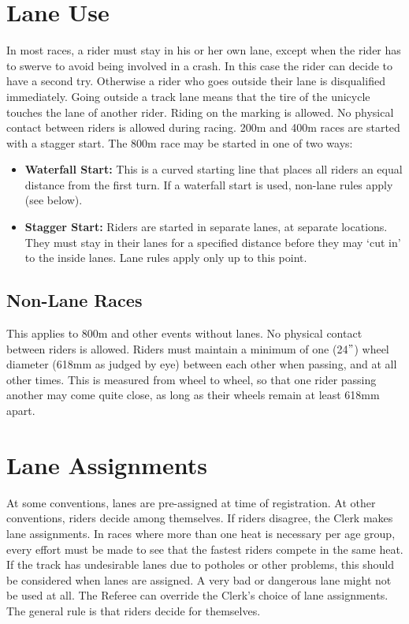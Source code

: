\section{Lane Use}
In most races, a rider must stay in his or her own lane, except when the rider has to swerve to avoid being involved in a crash.
In this case the rider can decide to have a second try.
Otherwise a rider who goes outside their lane is disqualified immediately.
Going outside a track lane means that the tire of the unicycle touches the lane of another rider.
Riding on the marking is allowed.
No physical contact between riders is allowed during racing.
200m and 400m races are started with a stagger start.
The 800m race may be started in one of two ways:
\begin{itemize}
\item \textbf{Waterfall Start:} This is a curved starting line that places all riders an equal distance from the first turn.
If a waterfall start is used, non-lane rules apply (see below).
\item \textbf{Stagger Start:} Riders are started in separate lanes, at separate locations.
They must stay in their lanes for a specified distance before they may ‘cut in' to the inside lanes.
Lane rules apply only up to this point.
\end{itemize}

\subsection{Non-Lane Races \label{subsec:track-field_lane-use_non-lane-races}}
This applies to 800m and other events without lanes.
No physical contact between riders is allowed.
Riders must maintain a minimum of one (24$"$) wheel diameter (618mm as judged by eye) between each other when passing, and at all other times.
This is measured from wheel to wheel, so that one rider passing another may come quite close, as long as their wheels remain at least 618mm apart.

\section{Lane Assignments}
At some conventions, lanes are pre-assigned at time of registration.
At other conventions, riders decide among themselves.
If riders disagree, the Clerk makes lane assignments.
In races where more than one heat is necessary per age group, every effort must be made to see that the fastest riders compete in the same heat.
If the track has undesirable lanes due to potholes or other problems, this should be considered when lanes are assigned.
A very bad or dangerous lane might not be used at all.
The Referee can override the Clerk's choice of lane assignments.
The general rule is that riders decide for themselves.


